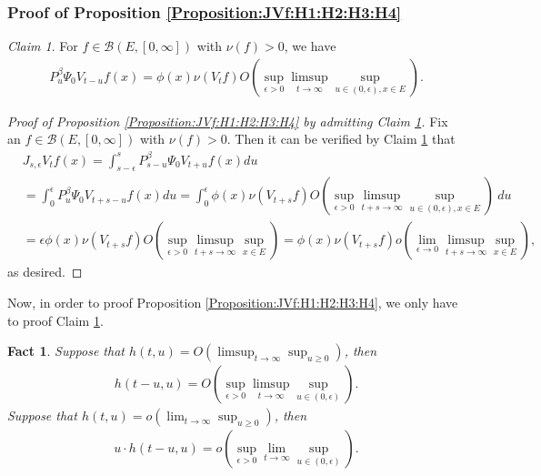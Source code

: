\documentclass[12pt,a4paper]{amsart}
\numberwithin{equation}{section}
\theoremstyle{plain}
\newtheorem{fact}[thm]{Fact}
\theoremstyle{definition}
\theoremstyle{remark}
\newtheorem{claim}[thm]{Claim}
\begin{document}
\subsubsection{Proof of Proposition \ref{Proposition:JVf:H1:H2:H3:H4}}
\label{subsubsec:PJVf}
\begin{claim} \label{Claim:PPV:H1:H2:H3:H4} 
For $f \in \mathcal B(E,[0,\infty])$ with $\nu(f)>0$, we have 
\begin{align}
 P_u^\beta \Psi_0 V_{t-u} f(x) 
 = \phi(x)\nu(V_tf) O(\sup_{\epsilon > 0} \limsup_{t\to \infty} \sup_{u \in (0,\epsilon), x\in E}).
 \end{align}
\end{claim}
\begin{proof}[{Proof of Proposition \ref{Proposition:JVf:H1:H2:H3:H4} by admitting Claim \ref{Claim:PPV:H1:H2:H3:H4}}]
Fix an $f\in \mathcal B(E,[0,\infty])$ with $\nu(f)>0$.
Then it can be verified by Claim \ref{Claim:PPV:H1:H2:H3:H4} that
\begin{align}
 &J_{s,\epsilon}V_tf(x) 
 = \int_{s-\epsilon}^s P_{s-u}^\beta \Psi_0 V_{t+u} f(x)du 
 \\&= \int_0^\epsilon P_u^\beta \Psi_0 V_{t+s - u}f(x) du
 = \int_0^\epsilon \phi(x) \nu(V_{t+s}f) O(\sup_{\epsilon > 0} \limsup_{t+s\to \infty} \sup_{u \in (0,\epsilon), x\in E})~du
 \\&= \epsilon \phi(x)\nu(V_{t+s}f) O(\sup_{\epsilon > 0} \limsup_{t+s \to \infty} \sup_{x\in E})
 = \phi(x)\nu(V_{t+s}f)o(\lim_{\epsilon \to 0} \limsup_{t+s \to \infty} \sup_{x\in E}),
 \end{align}
as desired.
\end{proof}
Now, in order to proof Proposition \ref{Proposition:JVf:H1:H2:H3:H4}, we only have to proof Claim \ref{Claim:PPV:H1:H2:H3:H4}.
\begin{fact} \label{Fact:TO!} 
Suppose that $h(t,u) = O(\limsup_{t\to \infty} \sup_{u\geq 0})$, then 
\begin{align}
 h(t-u, u)
 = O(\sup_{\epsilon > 0} \limsup_{t\to \infty} \sup_{u \in (0,\epsilon)}).
 \end{align}
Suppose that $h(t,u) = o(\lim_{t\to \infty} \sup_{u \geq 0})$, then 
\begin{align}
 u\cdot h(t-u,u) 
 = o(\sup_{\epsilon > 0} \lim_{t\to \infty} \sup_{u \in (0,\epsilon)}).
 \end{align}
\end{fact}
\end{document}
